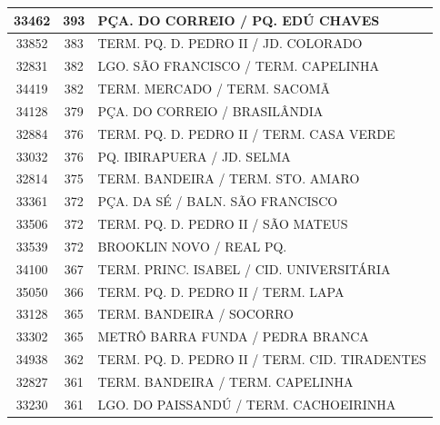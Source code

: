 \documentclass[
	12pt,				%
	oneside,			%
	a4paper,			%
	english,			%
	brazil				%
	]{abntex2ppgsi}
\begin{document}
{{\begin{apendicesenv}
\begin{longtable}{c|c|p{7cm}}
    33462 & 393   & PÇA. DO CORREIO / PQ. EDÚ CHAVES \\
\hline

    33852 & 383   & TERM. PQ. D. PEDRO II / JD. COLORADO \\
\hline

    32831 & 382   & LGO. SÃO FRANCISCO / TERM. CAPELINHA \\
\hline

    34419 & 382   & TERM. MERCADO / TERM. SACOMÃ \\
\hline

    34128 & 379   & PÇA. DO CORREIO / BRASILÂNDIA \\
\hline

    32884 & 376   & TERM. PQ. D. PEDRO II / TERM. CASA VERDE \\
\hline

    33032 & 376   & PQ. IBIRAPUERA / JD. SELMA \\
\hline

    32814 & 375   & TERM. BANDEIRA / TERM. STO. AMARO \\
\hline

    33361 & 372   & PÇA. DA SÉ / BALN. SÃO FRANCISCO \\
\hline

    33506 & 372   & TERM. PQ. D. PEDRO II / SÃO MATEUS \\
\hline

    33539 & 372   & BROOKLIN NOVO / REAL PQ. \\
\hline

    34100 & 367   & TERM. PRINC. ISABEL / CID. UNIVERSITÁRIA \\
\hline

    35050 & 366   & TERM. PQ. D. PEDRO II / TERM. LAPA \\
\hline

    33128 & 365   & TERM. BANDEIRA / SOCORRO \\
\hline

    33302 & 365   & METRÔ BARRA FUNDA / PEDRA BRANCA \\
\hline

    34938 & 362   & TERM. PQ. D. PEDRO II / TERM. CID. TIRADENTES \\
\hline

    32827 & 361   & TERM. BANDEIRA / TERM. CAPELINHA \\
\hline

    33230 & 361   & LGO. DO PAISSANDÚ / TERM. CACHOEIRINHA \\
\hline


\end{longtable}
\end{apendicesenv}}}
\end{document}
